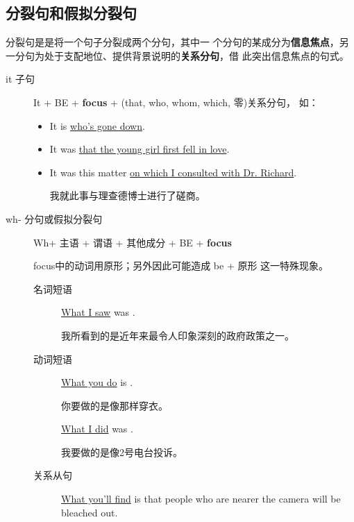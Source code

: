 \subsection{分裂句和假拟分裂句}

 分裂句是是将一个句子分裂成两个分句，其中一
个分句的某成分为\textbf{信息焦点}，另一分句为处于支配地位、提供背景说明的\textbf{关系分句}，借
此突出信息焦点的句式。

\begin{description}
\item[it 子句] It + BE + \textbf{focus} + (that, who, whom, which, 零)关系分句，
  如：
  \begin{itemize}
  \item It is  \ul{who’s gone down}.

  \item It was  \ul{that the young girl first fell in love}.


  \item It was {this matter} \ul{on which I consulted with Dr. Richard}.

    我就此事与理查德博士进行了磋商。
  \end{itemize}


\item[wh- 分句或假拟分裂句] Wh+ 主语 + 谓语 + 其他成分 + BE + \textbf{focus}

  focus中的动词用原形；另外因此可能造成 be + 原形 这一特殊现象。

  \begin{description}
  \item[名词短语] \ul{What I saw} was .

    我所看到的是近年来最令人印象深刻的政府政策之一。
  \item[动词短语] \ul{What you do} is .

    你要做的是像那样穿衣。

   \ul{What I did} was .

   我要做的是像2号电台投诉。

 \item[关系从句] \ul{What you’ll find} is {that people who are nearer the camera will be bleached out}.
  \end{description}
\end{description}




